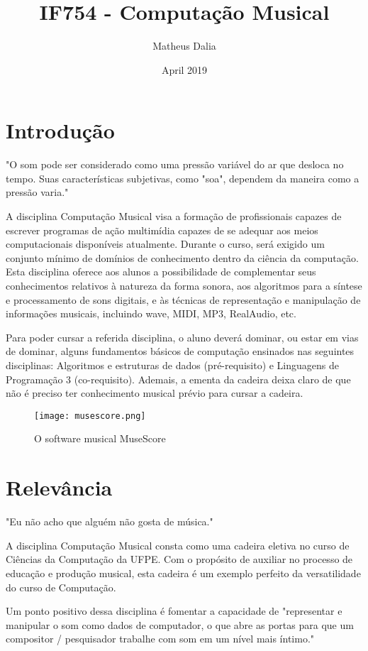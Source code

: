 \documentclass{article}
\title{IF754 - Computação Musical}
\author{Matheus Dalia}
\date{April 2019}
\begin{document}
\maketitle

\section{Introdução}
"O som pode ser considerado como uma pressão variável do ar que desloca no tempo. Suas características subjetivas, como "soa", dependem da maneira como a pressão varia." \citep{techMIT}

A disciplina Computação Musical visa a formação de profissionais capazes de escrever programas de ação multimídia capazes de se adequar aos meios computacionais disponíveis atualmente. Durante o curso, será exigido um conjunto mínimo de domínios de conhecimento dentro da ciência da computação. Esta disciplina oferece aos alunos a possibilidade de complementar seus conhecimentos relativos à natureza da forma sonora, aos algoritmos para a síntese e processamento de sons digitais, e às técnicas de representação e manipulação de informações  musicais, incluindo wave, MIDI, MP3, RealAudio, etc.

Para poder cursar a referida disciplina, o aluno deverá dominar, ou estar em vias de dominar, alguns fundamentos básicos de computação ensinados nas seguintes disciplinas: Algoritmos e estruturas de dados (pré-requisito) e Linguagens de Programação 3 (co-requisito). Ademais, a ementa da cadeira deixa claro de que não é preciso ter conhecimento musical prévio para cursar a cadeira.

\begin{figure}[h!]
\centering
\texttt{[image: musescore.png]}
\caption{O software musical MuseScore}
\label{fig:Peixe}
\end{figure}

\section{Relevância}
"Eu não acho que alguém não gosta de música."\citep{science}

A disciplina Computação Musical consta como uma cadeira eletiva no curso de Ciências da Computação da UFPE. Com o propósito de auxiliar no processo de educação e produção musical, esta cadeira é um exemplo perfeito da versatilidade do curso de Computação.

Um ponto positivo dessa disciplina é fomentar a capacidade de "representar e manipular o som como dados de computador, o que abre as portas para que um compositor / pesquisador trabalhe com som em um nível mais íntimo."\citep{represent}
\end{document}
